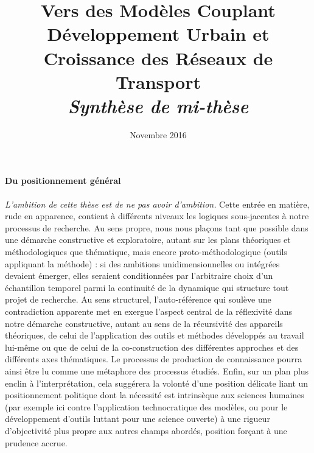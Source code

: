 




\title{Vers des Modèles Couplant Développement Urbain et Croissance des Réseaux de Transport\bigskip\\
\textit{Synthèse de mi-thèse}
}
\author{}
\date{Novembre 2016}


\maketitle

\justify


\begin{abstract}
\end{abstract}






\paragraph{Du positionnement général}

\emph{L'ambition de cette thèse est de ne pas avoir d'ambition.} Cette entrée en matière, rude en apparence, contient à différents niveaux les logiques sous-jacentes à notre processus de recherche. Au sens propre, nous nous plaçons tant que possible dans une démarche constructive et exploratoire, autant sur les plans théoriques et méthodologiques que thématique, mais encore proto-méthodologique (outils appliquant la méthode) : si des ambitions unidimensionnelles ou intégrées devaient émerger, elles seraient conditionnées par l'arbitraire choix d'un échantillon temporel parmi la continuité de la dynamique qui structure tout projet de recherche. Au sens structurel, l'auto-référence qui soulève une contradiction apparente met en exergue l'aspect central de la réflexivité dans notre démarche constructive, autant au sens de la récursivité des appareils théoriques, de celui de l'application des outils et méthodes développés au travail lui-même ou que de celui de la co-construction des différentes approches et des différents axes thématiques. Le processus de production de connaissance pourra ainsi être lu comme une métaphore des processus étudiés. Enfin, sur un plan plus enclin à l'interprétation, cela suggérera la volonté d'une position délicate liant un positionnement politique dont la nécessité est intrinsèque aux sciences humaines (par exemple ici contre l'application technocratique des modèles, ou pour le développement d'outils luttant pour une science ouverte) à une rigueur d'objectivité plus propre aux autres champs abordés, position forçant à une prudence accrue.


